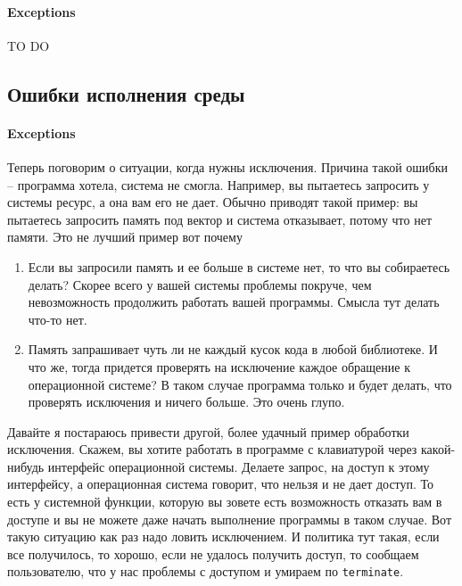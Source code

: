 
\paragraph{Exceptions}

TO DO


\subsection{Ошибки исполнения среды}

\paragraph{Exceptions}

Теперь поговорим о ситуации, когда нужны исключения.
Причина такой ошибки -- программа хотела, система не смогла.
Например, вы пытаетесь запросить у системы ресурс, а она вам его не дает.
Обычно приводят такой пример: вы пытаетесь запросить память под вектор и система отказывает, потому что нет памяти.
Это не лучший пример вот почему
\begin{enumerate}
\item Если вы запросили память и ее больше в системе нет, то что вы собираетесь делать?
Скорее всего у вашей системы проблемы покруче, чем невозможность продолжить работать вашей программы.
Смысла тут делать что-то нет.

\item Память запрашивает чуть ли не каждый кусок кода в любой библиотеке.
И что же, тогда придется проверять на исключение каждое обращение к операционной системе?
В таком случае программа только и будет делать, что проверять исключения и ничего больше.
Это очень глупо.
\end{enumerate}
Давайте я постараюсь привести другой, более удачный пример обработки исключения.
Скажем, вы хотите работать в программе с клавиатурой через какой-нибудь интерфейс операционной системы.
Делаете запрос, на доступ к этому интерфейсу, а операционная система говорит, что нельзя и не дает доступ.
То есть у системной функции, которую вы зовете есть возможность отказать вам в доступе и вы не можете даже начать выполнение программы в таком случае.
Вот такую ситуацию как раз надо ловить исключением.
И политика тут такая, если все получилось, то хорошо, если не удалось получить доступ, то сообщаем пользователю, что у нас проблемы с доступом и умираем по \verb"terminate".

